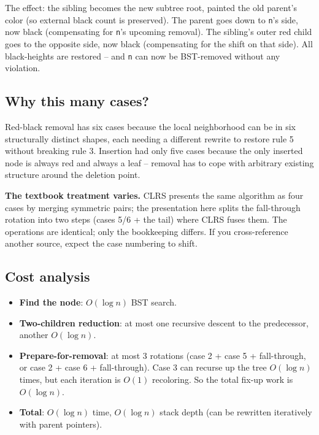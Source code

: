 \documentclass[11pt]{article}
\begin{document}
The effect: the sibling becomes the new subtree root, painted the old parent's color (so external black count is preserved). The parent goes down to \texttt{n}'s side, now black (compensating for \texttt{n}'s upcoming removal). The sibling's outer red child goes to the opposite side, now black (compensating for the shift on that side). All black-heights are restored -- and \texttt{n} can now be BST-removed without any violation.

\subsection*{Why this many cases?}

\begin{ideabox}
Red-black removal has six cases because the local neighborhood can be in six structurally distinct shapes, each needing a different rewrite to restore rule 5 without breaking rule 3. Insertion had only five cases because the only inserted node is always red and always a leaf -- removal has to cope with arbitrary existing structure around the deletion point.
\end{ideabox}

\begin{warnbox}
\textbf{The textbook treatment varies.} CLRS presents the same algorithm as four cases by merging symmetric pairs; the presentation here splits the fall-through rotation into two steps (cases 5/6 + the tail) where CLRS fuses them. The operations are identical; only the bookkeeping differs. If you cross-reference another source, expect the case numbering to shift.
\end{warnbox}

\subsection*{Cost analysis}

\begin{itemize}[leftmargin=*]
    \item \textbf{Find the node}: $O(\log n)$ BST search.
    \item \textbf{Two-children reduction}: at most one recursive descent to the predecessor, another $O(\log n)$.
    \item \textbf{Prepare-for-removal}: at most 3 rotations (case 2 + case 5 + fall-through, or case 2 + case 6 + fall-through). Case 3 can recurse up the tree $O(\log n)$ times, but each iteration is $O(1)$ recoloring. So the total fix-up work is $O(\log n)$.
    \item \textbf{Total}: $O(\log n)$ time, $O(\log n)$ stack depth (can be rewritten iteratively with parent pointers).
\end{itemize}
\end{document}
